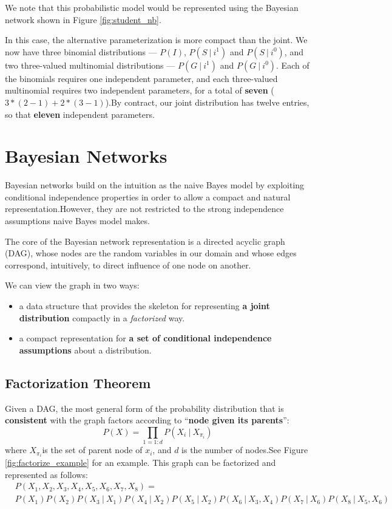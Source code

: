 \documentclass[twoside]{article}
\begin{document}
We note that this probabilistic model would be represented using the Bayesian network shown in Figure \ref{fig:student_nb}.

In this case, the alternative parameterization is more compact than the joint. We now have three binomial distributions --- \(P(I)\), \(P(S\ |\ i^1)\) and \(P(S\ |\ i^0)\), and two three-valued multinomial distributions --- \(P(G\ |\ i^1)\) and \(P(G\ |\ i^0)\). Each of the binomials requires one independent parameter, and each three-valued multinomial requires two independent parameters, for a total of \textbf{seven} (\(3 * (2 - 1) + 2 * (3 - 1)\)).By contract, our joint distribution has twelve entries, so that \textbf{eleven} independent parameters.

\section{Bayesian Networks}

Bayesian networks build on the intuition as the naive Bayes model by exploiting conditional independence properties in order to allow a compact and natural representation.However, they are not restricted to the strong independence assumptions naive Bayes model makes.

The core of the Bayesian network representation is a directed acyclic graph (DAG), whose nodes are the random variables in our domain and whose edges correspond, intuitively, to direct influence of one node on another.

We can view  the graph in two ways:
\begin{itemize}
\item a data structure that provides the skeleton for representing \textbf{a joint distribution} compactly in a \emph{factorized} way.
\item a compact representation for \textbf{a set of conditional independence assumptions} about a distribution.
\end{itemize}

\subsection{Factorization Theorem}

Given a DAG, the most general form of the probability distribution that is \textbf{consistent} with the graph factors according to ``\textbf{node given its parents}'':\[P(X) = \prod_{1=1:d}{P(X_i\ |\ X_{\pi_i})}\] where \(X_{\pi_i}\)is the set of parent node of \(x_i\), and \(d\) is the number of nodes.See Figure \ref{fig:factorize_example} for an example.
This graph can be factorized and represented as follows: 
\[
\begin{split}
&P(X_1,X_2,X_3,X_4,X_5,X_6,X_7,X_8) = \\ 
&P(X_1)P(X_2)P(X_3\ |\ X_1)P(X_4\ |\ X_2)P(X_5\ |\ X_2)P(X_6\ |\ X_3, X_4)P(X_7\ |\ X_6)P(X_8\ |\ X_5, X_6)
\end{split}
\]
\end{document}
